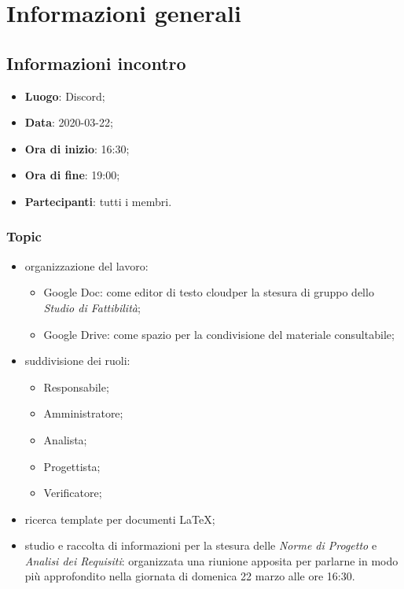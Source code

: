 \section{Informazioni generali}
\subsection{Informazioni incontro}
\begin{itemize}
\item \textbf{Luogo}: Discord\glo;
\item \textbf{Data}: 2020-03-22;
\item \textbf{Ora di inizio}: 16:30;
\item \textbf{Ora di fine}: 19:00;
\item \textbf{Partecipanti}: tutti i membri.
\end{itemize}

\subsubsection{Topic}
\begin{itemize}
\item organizzazione del lavoro:
\begin{itemize}
\item Google Doc: come editor di testo cloud\glo per la stesura di gruppo dello \textit{Studio di Fattibilità};
\item Google Drive: come spazio per la condivisione del materiale consultabile;
\end{itemize}
\item suddivisione dei ruoli: \begin{itemize}
\item Responsabile;
\item Amministratore;
\item Analista;
\item Progettista;
\item Verificatore;
\end{itemize}
\item ricerca template per documenti \LaTeX{};
\item studio e raccolta di informazioni per la stesura delle \textit{Norme di Progetto} e \textit{Analisi dei Requisiti}: organizzata una riunione apposita per parlarne in modo più approfondito nella giornata di domenica 22 marzo alle ore 16:30.
\end{itemize}